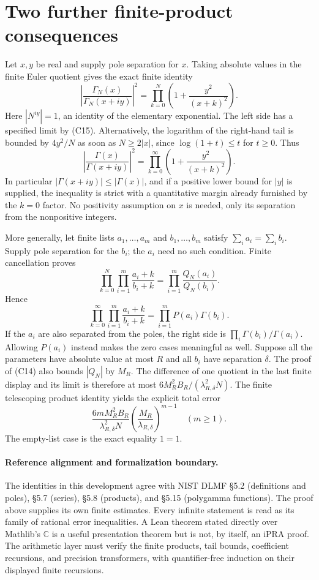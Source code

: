 \section{Two further finite-product consequences}

Let $x,y$ be real and supply pole separation for $x$.  Taking absolute
values in the finite Euler quotient gives the exact finite identity
\[
 \left|\frac{\Gamma_N(x)}{\Gamma_N(x+iy)}\right|^2
       =\prod_{k=0}^N\left(1+\frac{y^2}{(x+k)^2}\right).
\]
Here $|N^{iy}|=1$, an identity of the elementary exponential.
The left side has a specified limit by (C15).  Alternatively, the
logarithm of the right-hand tail is bounded by $4y^2/N$ as soon as
$N\geq2|x|$, since $\log(1+t)\leq t$ for $t\geq0$.
Thus
\[
 \boxed{\displaystyle
 \left|\frac{\Gamma(x)}{\Gamma(x+iy)}\right|^2
       =\prod_{k=0}^{\infty}\left(1+\frac{y^2}{(x+k)^2}\right).}
 \tag{C46}
\]
In particular $|\Gamma(x+iy)|\leq|\Gamma(x)|$, and if a positive
lower bound for $|y|$ is supplied, the inequality is strict with a
quantitative margin already furnished by the $k=0$ factor.  No
positivity assumption on $x$ is needed, only its separation from the
nonpositive integers.

More generally, let finite lists $a_1,\ldots,a_m$ and
$b_1,\ldots,b_m$ satisfy $\sum_i a_i=\sum_i b_i$.  Supply pole
separation for the $b_i$; the $a_i$ need no such condition.  Finite
cancellation proves
\[
 \prod_{k=0}^{N}\prod_{i=1}^m\frac{a_i+k}{b_i+k}
       =\prod_{i=1}^m\frac{Q_N(a_i)}{Q_N(b_i)}.
\]
Hence
\[
 \boxed{\displaystyle
 \prod_{k=0}^{\infty}\prod_{i=1}^m\frac{a_i+k}{b_i+k}
       =\prod_{i=1}^m P(a_i)\Gamma(b_i).}
 \tag{C47}
\]
If the $a_i$ are also separated from the poles, the right side is
$\prod_i\Gamma(b_i)/\Gamma(a_i)$.  Allowing $P(a_i)$ instead makes
the zero cases meaningful as well.  Suppose all the parameters have
absolute value at most $R$ and all $b_i$ have separation $\delta$.
The proof of (C14) also bounds $|Q_N|$ by $M_R$.  The difference of
one quotient in the last finite display and its limit is therefore
at most $6M_R^2B_R/(\lambda_{R,\delta}^2N)$.
The finite telescoping product identity yields the explicit total error
\[
 \frac{6mM_R^2B_R}{\lambda_{R,\delta}^2N}
       \left(\frac{M_R}{\lambda_{R,\delta}}\right)^{m-1}
 \quad(m\geq1).
 \tag{C48}
\]
The empty-list case is the exact equality $1=1$.

\paragraph{Reference alignment and formalization boundary.}
The identities in this development agree with NIST DLMF
\S5.2 (definitions and poles), \S5.7 (series), \S5.8 (products), and
\S5.15 (polygamma functions).  The proof above supplies its own finite
estimates.  Every infinite statement is read as its family of rational
error inequalities.  A Lean theorem stated directly over Mathlib's
$\mathbb C$ is a useful presentation theorem but is not, by itself,
an iPRA proof.  The arithmetic layer must verify the finite products,
tail bounds, coefficient recursions, and precision transformers, with
quantifier-free induction on their displayed finite recursions.
